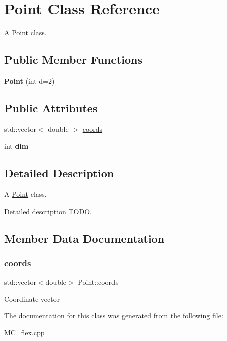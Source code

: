 \hypertarget{class_point}{}\section{Point Class Reference}
\label{class_point}


A \hyperlink{class_point}{Point} class.  


\subsection*{Public Member Functions}
\begin{DoxyCompactItemize}
\item 
\mbox{\label{class_point_a9cc79bc8d5bf1a8967f427376bede8b9}} 
{\bfseries Point} (int d=2)
\end{DoxyCompactItemize}
\subsection*{Public Attributes}
\begin{DoxyCompactItemize}
\item 
std\+::vector$<$ double $>$ \hyperlink{class_point_a465efb6efd0c3e0d9cd09e57e2fa230d}{coords}
\item 
\mbox{\label{class_point_ad506f1484a4c9a0ba5e1d40019584de9}} 
int {\bfseries dim}
\end{DoxyCompactItemize}


\subsection{Detailed Description}
A \hyperlink{class_point}{Point} class. 

Detailed description T\+O\+DO. 

\subsection{Member Data Documentation}
\mbox{\label{class_point_a465efb6efd0c3e0d9cd09e57e2fa230d}} 
\subsubsection{\texorpdfstring{coords}{coords}}
{\footnotesize\ttfamily std\+::vector$<$double$>$ Point\+::coords}

Coordinate vector 

The documentation for this class was generated from the following file\+:\begin{DoxyCompactItemize}
\item 
M\+C\+\_\+flex.\+cpp\end{DoxyCompactItemize}
